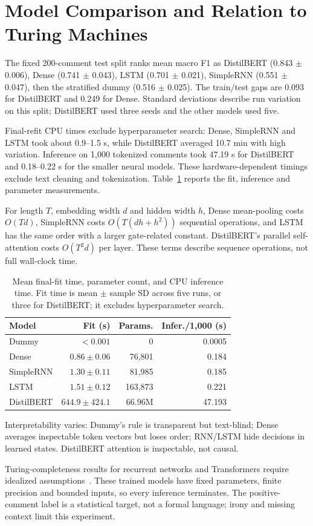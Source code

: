 \section{Model Comparison and Relation to Turing Machines}
\label{sec:comparison}

The fixed 200-comment test split ranks mean macro F1 as DistilBERT (0.843
$\pm$ 0.006), Dense (0.741 $\pm$ 0.043), LSTM (0.701 $\pm$ 0.021),
SimpleRNN (0.551 $\pm$ 0.047), then the stratified dummy (0.516 $\pm$ 0.025).
The train/test gaps are 0.093 for DistilBERT and 0.249 for Dense. Standard
deviations describe run variation on this split; DistilBERT used three seeds
and the other models used five.

Final-refit CPU times exclude hyperparameter search: Dense, SimpleRNN and LSTM
took about 0.9--1.5 s, while DistilBERT averaged 10.7 min with high variation.
Inference on 1,000 tokenized comments took 47.19 s for DistilBERT and
0.18--0.22 s for the smaller neural models. These hardware-dependent timings
exclude text cleaning and tokenization. Table~\ref{tab:model-cost} reports the
fit, inference and parameter measurements.

For length $T$, embedding width $d$ and hidden width $h$, Dense mean-pooling
costs $O(Td)$, SimpleRNN costs $O(T(dh+h^2))$ sequential operations, and LSTM
has the same order with a larger gate-related constant. DistilBERT's parallel
self-attention costs $O(T^2d)$ per layer. These terms describe sequence
operations, not full wall-clock time.

\begin{table}[t]
\caption{Mean final-fit time, parameter count, and CPU inference time. Fit time is mean $\pm$ sample SD across five runs, or three for DistilBERT; it excludes hyperparameter search.}
\label{tab:model-cost}
\centering\scriptsize
\setlength{\tabcolsep}{2pt}
\begin{tabular}{@{}lrrr@{}}
\toprule
Model & Fit (s) & Params. & Infer./1,000 (s)\\
\midrule
Dummy & $<0.001$ & 0 & 0.0005\\
Dense & $0.86\pm0.06$ & 76,801 & 0.184\\
SimpleRNN & $1.30\pm0.11$ & 81,985 & 0.185\\
LSTM & $1.51\pm0.12$ & 163,873 & 0.221\\
DistilBERT & $644.9\pm424.1$ & 66.96M & 47.193\\
\bottomrule
\end{tabular}
\end{table}

Interpretability varies: Dummy's rule is transparent but text-blind; Dense
averages inspectable token vectors but loses order; RNN/LSTM hide decisions in
learned states. DistilBERT attention is inspectable, not causal.

Turing-completeness results for recurrent networks and Transformers require
idealized assumptions~\cite{siegelmann1995computational,perez2021attention}.
These trained models have fixed parameters, finite precision and bounded inputs,
so every inference terminates. The positive-comment label is a statistical
target, not a formal language; irony and missing context limit this experiment.
